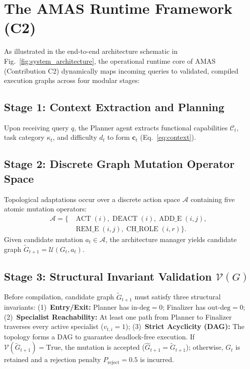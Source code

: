 \documentclass[conference]{IEEEtran}
\begin{document}
\section{The AMAS Runtime Framework (C2)}
\label{sec:runtime_framework}



As illustrated in the end-to-end architecture schematic in Fig.~\ref{fig:system_architecture}, the operational runtime core of AMAS (Contribution C2) dynamically maps incoming queries to validated, compiled execution graphs across four modular stages:

\subsection{Stage 1: Context Extraction and Planning}
Upon receiving query $q$, the Planner agent extracts functional capabilities $\mathcal{C}_t$, task category $\kappa_t$, and difficulty $d_t$ to form $\mathbf{c}_t$ (Eq.~\eqref{eq:context}).

\subsection{Stage 2: Discrete Graph Mutation Operator Space}
Topological adaptations occur over a discrete action space $\mathcal{A}$ containing five atomic mutation operators:
\begin{equation}
\begin{aligned}
\mathcal{A} = \{ & \operatorname{ACT}(i), \operatorname{DEACT}(i), \operatorname{ADD\_E}(i,j), \\
& \operatorname{REM\_E}(i,j), \operatorname{CH\_ROLE}(i,r) \}.
\end{aligned}
\end{equation}
Given candidate mutation $a_t \in \mathcal{A}$, the architecture manager yields candidate graph $\widetilde{G}_{t+1} = \mathcal{U}(G_t, a_t)$.

\subsection{Stage 3: Structural Invariant Validation $\mathcal{V}(G)$}
Before compilation, candidate graph $\widetilde{G}_{t+1}$ must satisfy three structural invariants: (1)~\textbf{Entry/Exit:} Planner has $\mathrm{in\text{-}deg} = 0$; Finalizer has $\mathrm{out\text{-}deg} = 0$; (2)~\textbf{Specialist Reachability:} At least one path from Planner to Finalizer traverses every active specialist ($v_{t,i}=1$); (3)~\textbf{Strict Acyclicity (DAG):} The topology forms a DAG to guarantee deadlock-free execution. If $\mathcal{V}(\widetilde{G}_{t+1}) = \text{True}$, the mutation is accepted ($\widehat{G}_{t+1} = \widetilde{G}_{t+1}$); otherwise, $G_t$ is retained and a rejection penalty $P_{\mathrm{reject}} = 0.5$ is incurred.
\end{document}
